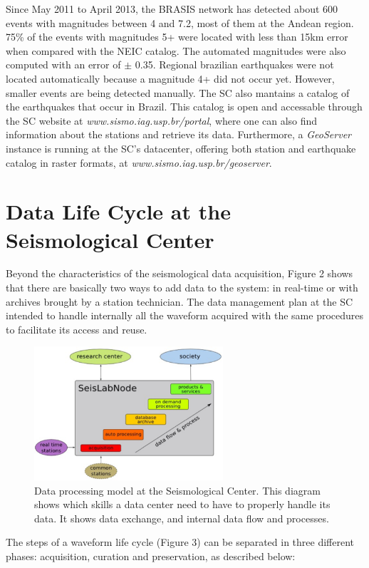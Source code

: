 \documentclass[twoside,letterpaper,twocolumn]{article}
\begin{document}
Since May 2011 to April 2013, the BRASIS network has detected about 600 events with magnitudes between 4 and 7.2, most of them at the Andean region. 75\% of the events with magnitudes 5+ were located with less than 15km error when compared with the NEIC catalog. The automated magnitudes were also computed with an error of  $ \pm $ 0.35. Regional brazilian earthquakes were not located automatically because a magnitude 4+ did not occur yet. However, smaller events are being detected manually. The SC also mantains a catalog of the earthquakes that occur in Brazil. This catalog is open and accessable through the SC website at \textit{www.sismo.iag.usp.br/portal}, where one can also find information about the stations and retrieve its data. Furthermore,  a \textit {GeoServer} instance is running at the SC's datacenter, offering both station and earthquake catalog in raster formats, at \textit{www.sismo.iag.usp.br/geoserver}.

\section{Data Life Cycle at the Seismological Center}

Beyond the characteristics of the seismological data acquisition, Figure 2 shows that there are basically two ways to add data to the system: in real-time or with archives brought by a station technician. The data management plan at the SC intended to handle internally all the waveform acquired with the same procedures to facilitate its access and reuse.

\begin{figure}[h!]
\centering
\includegraphics[width=7cm]{images/dataFlow.png}
\caption[Figure 2]{Data processing model at the Seismological Center. This diagram shows which skills a data center need to have to properly handle its data. It shows data exchange, and internal data flow and processes.}
\end{figure}

The steps of a waveform life cycle (Figure 3) can be separated in three different phases: acquisition, curation and preservation, as described below:
\end{document}
